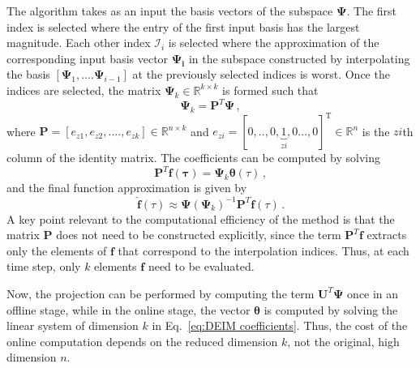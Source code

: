 \documentclass[]{interact}
\theoremstyle{plain}%
\theoremstyle{definition}
\theoremstyle{remark}
\begin{document}
The algorithm takes as an input the basis vectors of the subspace $\mathbf{\Psi}$.
The first index is selected where the entry of the first input basis has the largest magnitude.
Each other index $\mathcal{I}_i$ is selected where the approximation of the corresponding input basis vector $\mathbf{\Psi_i}$ in the subspace constructed by interpolating the basis $[\mathbf{\Psi}_1, ....\mathbf{\Psi}_{i-1}]$ at the previously selected indices is worst.
Once the indices are selected, the matrix $\mathbf{\Psi}_k \in \mathbb{R}^{k\times k}$ is formed such that
\begin{equation}
	\mathbf{\Psi}_k = \mathbf{P}^T\mathbf{\Psi}\, ,
\end{equation}
where $\mathbf{P} = [e_{z1}, e_{z2}, ....,e_{zk}] \in \mathbb{R}^{n\times k}$ and $e_{zi} = [0,.., 0, \underbrace{1}_{{zi}}, 0..., 0]^\text{T} \in \mathbb{R}^{n}$
is the  ${zi}$th column of the identity matrix.
The coefficients can be computed by solving
\begin{equation}
	\mathbf{P}^T\mathbf{f(\tau)}=\mathbf{\Psi}_k \boldsymbol{\theta}(\tau)\, ,
	\label{eq:DEIM coefficients}
\end{equation}
and the final function approximation is given by
\begin{equation}
	\hat{\mathbf{f}}(\tau)\approx\mathbf{\Psi}( \mathbf{\Psi}_k)^{-1}\mathbf{P}^T\mathbf{f} (\tau)\, .
\end{equation}
A key point relevant to the computational efficiency of the method is that the matrix $\mathbf{P}$ does not need to be constructed explicitly, since the term $\mathbf{P}^T\mathbf{f}$ extracts only the elements of $\mathbf{f}$ that correspond to the interpolation indices.
Thus, at each time step, only $k$ elements $\mathbf{f}$ need to be evaluated.

Now, the projection can be performed by computing the term $\mathbf{U}^T \mathbf{\Psi}$ once in an offline stage, while in the online stage, the vector $\boldsymbol{\theta}$ is computed by solving the linear system of dimension $k$ in Eq.~\ref{eq:DEIM coefficients}.
Thus, the cost of the online computation depends on the reduced dimension $k$, not the original, high dimension $n$.
\end{document}
